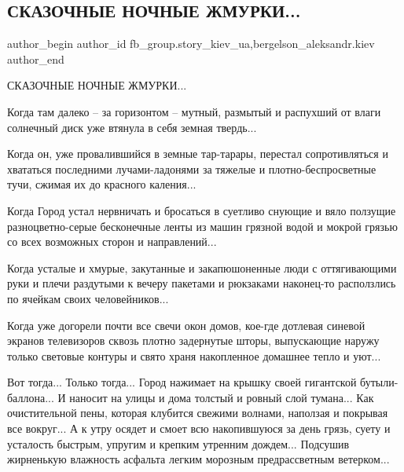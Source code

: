  
 
 
 
 
 
\subsection{СКАЗОЧНЫЕ НОЧНЫЕ ЖМУРКИ...}
\label{sec:12_12_2021.fb.fb_group.story_kiev_ua.3.zhmurki}
 
\ifcmt
 author_begin
   author_id fb_group.story_kiev_ua,bergelson_aleksandr.kiev
 author_end
\fi

СКАЗОЧНЫЕ НОЧНЫЕ ЖМУРКИ...

Когда там далеко – за горизонтом – мутный, размытый и распухший от влаги
солнечный диск уже втянула в себя земная твердь...

Когда он, уже провалившийся в земные тар-тарары, перестал сопротивляться и
хвататься последними лучами-ладонями за тяжелые и плотно-беспросветные тучи,
сжимая их до красного каления...

Когда Город устал нервничать и бросаться в суетливо снующие и вяло ползущие
разноцветно-серые бесконечные ленты из машин грязной водой и мокрой грязью
со всех возможных сторон и направлений...

Когда усталые и хмурые, закутанные и закапюшоненные люди с оттягивающими
руки и плечи раздутыми к вечеру пакетами и рюкзаками наконец-то расползлись
по ячейкам своих человейников...

Когда уже догорели почти все свечи окон домов, кое-где дотлевая синевой
экранов телевизоров сквозь плотно задернутые шторы, выпускающие наружу
только световые контуры и свято храня накопленное домашнее тепло и уют...

Вот тогда... Только тогда... Город нажимает на крышку своей гигантской
бутыли-баллона... И наносит на улицы и дома толстый и ровный слой тумана... Как
очистительной пены, которая клубится свежими волнами, наползая и покрывая
все вокруг... А к утру осядет и смоет всю накопившуюся за день грязь, суету и
усталость быстрым, упругим и крепким утренним дождем... Подсушив жирненькую
влажность асфальта легким морозным предрассветным ветерком...

